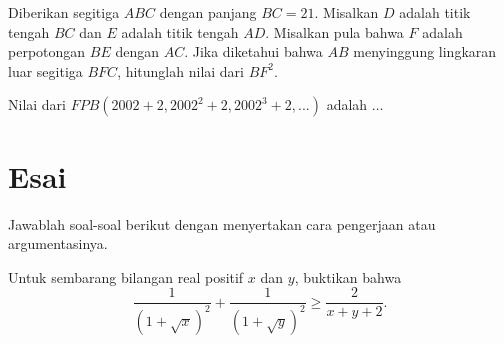 \documentclass[11pt]{scrartcl}
\begin{document}
	
	
	\begin{soalbaru}
		Diberikan segitiga $ABC$ dengan panjang $BC = 21$. Misalkan $D $ adalah titik tengah
		$BC $ dan $E $ adalah titik tengah $AD$. Misalkan pula bahwa $F $ adalah perpotongan $BE$
		dengan $AC$. Jika diketahui bahwa $AB $ menyinggung lingkaran luar segitiga $BFC$,
		hitunglah nilai dari $BF^2$.
	\end{soalbaru}
	
	\begin{soalbaru}
		Nilai dari $FPB(2002+2,2002^2+2,2002^3+2,...)$ adalah $\dots$
	\end{soalbaru}
	
	
	
	
	
	\section{Esai}
	Jawablah soal-soal berikut dengan menyertakan cara pengerjaan atau argumentasinya.
	
	\begin{soalbaru}
	Untuk sembarang bilangan real positif $x$ dan $y$, buktikan bahwa $$\dfrac{1}{(1+\sqrt{x})^2}+\dfrac{1}{(1+\sqrt{y})^2} \ge \dfrac{2}{x+y+2}.$$
	\end{soalbaru}
	
\end{document}
